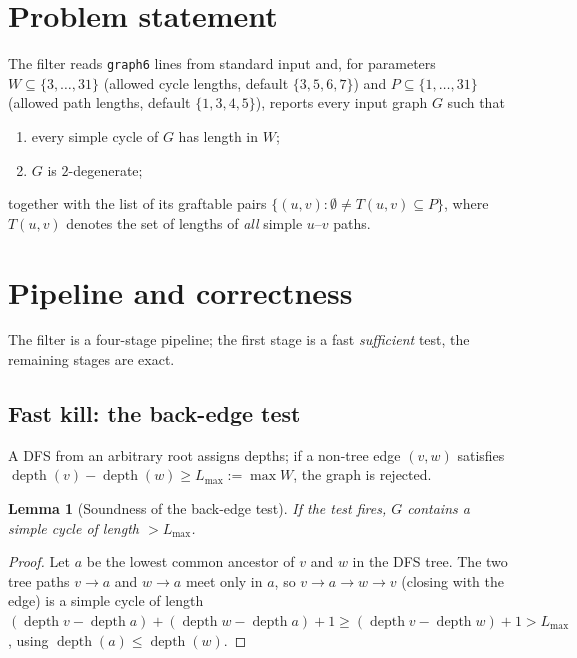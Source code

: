 \documentclass[11pt]{article}
\newtheorem{lemma}[theorem]{Lemma}
\begin{document}
\section{Problem statement}

The filter reads \texttt{graph6} lines from standard input and, for
parameters $W \subseteq \{3,\dots,31\}$ (allowed cycle lengths,
default $\{3,5,6,7\}$) and $P \subseteq \{1,\dots,31\}$ (allowed path
lengths, default $\{1,3,4,5\}$), reports every input graph $G$ such
that
\begin{enumerate}
\item every simple cycle of $G$ has length in $W$;
\item $G$ is $2$-degenerate;
\end{enumerate}
together with the list of its graftable pairs
$\{(u,v) : \emptyset \neq T(u,v) \subseteq P\}$, where $T(u,v)$
denotes the set of lengths of \emph{all} simple $u$--$v$ paths.

\section{Pipeline and correctness}

The filter is a four-stage pipeline; the first stage is a fast
\emph{sufficient} test, the remaining stages are exact.

\subsection{Fast kill: the back-edge test}

A DFS from an arbitrary root assigns depths; if a non-tree edge
$(v,w)$ satisfies $\operatorname{depth}(v)-\operatorname{depth}(w)
\ge L_{\max} := \max W$, the graph is rejected.

\begin{lemma}[Soundness of the back-edge test]
If the test fires, $G$ contains a simple cycle of length
$> L_{\max}$.
\end{lemma}
\begin{proof}
Let $a$ be the lowest common ancestor of $v$ and $w$ in the DFS
tree. The two tree paths $v\to a$ and $w \to a$ meet only in $a$, so
$v \to a \to w \to v$ (closing with the edge) is a simple cycle of
length $(\operatorname{depth}v - \operatorname{depth}a) +
(\operatorname{depth}w - \operatorname{depth}a) + 1 \ge
(\operatorname{depth}v - \operatorname{depth}w) + 1 > L_{\max}$,
using $\operatorname{depth}(a)\le\operatorname{depth}(w)$.
\end{proof}
\end{document}

